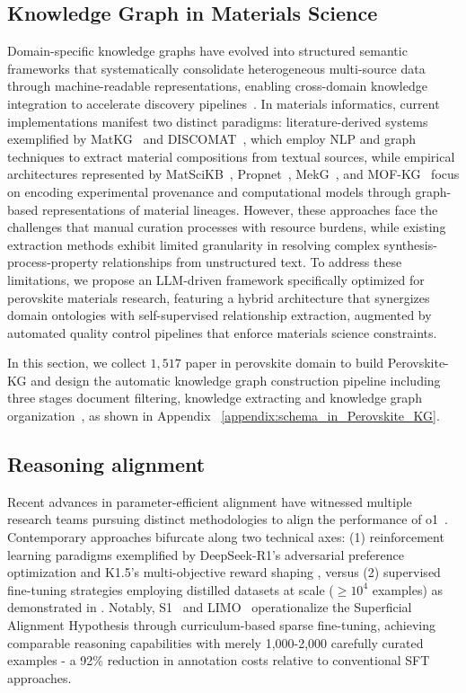 \subsection{Knowledge Graph in Materials Science}
Domain-specific knowledge graphs have evolved into structured semantic frameworks that systematically consolidate heterogeneous multi-source data through machine-readable representations, enabling cross-domain knowledge integration to accelerate discovery pipelines~\cite{pan2024unifying,song2024scene,zhu2022multi}. 
In materials informatics, current implementations manifest two distinct paradigms: literature-derived systems exemplified by MatKG~\cite{venugopal2024matkg} and DISCOMAT~\cite{gupta2023discomat}, which employ NLP and graph techniques to extract material compositions from textual sources, while empirical architectures represented by MatSciKB~\cite{zhang2024honeycomb}, Propnet~\cite{mrdjenovich2020propnet}, MekG~\cite{statt2023materials}, and MOF-KG~\cite{an2022building} focus on encoding experimental provenance and computational models through graph-based representations of material lineages. 
However, these approaches face the challenges that manual curation processes with resource burdens, while existing extraction methods exhibit limited granularity in resolving complex synthesis-process-property relationships from unstructured text. 
To address these limitations, we propose an LLM-driven framework specifically optimized for perovskite materials research, featuring a hybrid architecture that synergizes domain ontologies with self-supervised relationship extraction, augmented by automated quality control pipelines that enforce materials science constraints. 

In this section, we collect $1,517$ paper in perovskite domain to build Perovskite-KG and design the automatic knowledge graph construction pipeline including three stages document filtering, knowledge extracting and knowledge graph organization~\cite{mrdjenovich2020propnet}, as shown in Appendix ~\ref{appendix:schema_in_Perovskite_KG}.





\subsection{Reasoning alignment}
Recent advances in parameter-efficient alignment have witnessed multiple research teams pursuing distinct methodologies to align the performance of o1~\citep{o1}. Contemporary approaches bifurcate along two technical axes: (1) reinforcement learning paradigms exemplified by DeepSeek-R1's adversarial preference optimization \citep{guo2025deepseek} and K1.5's multi-objective reward shaping \citep{k1.5}, versus (2) supervised fine-tuning strategies employing distilled datasets at scale ($\geq10^4$ examples) as demonstrated in \citep{sky_t1,xu2025redstardoesscalinglongcot,bespoke_stratos}. Notably, S1~\citep{s1} and LIMO~\citep{limo} operationalize the Superficial Alignment Hypothesis \citep{zhou2023lima} through curriculum-based sparse fine-tuning, achieving comparable reasoning capabilities with merely 1,000-2,000 carefully curated examples - a 92\% reduction in annotation costs relative to conventional SFT approaches.

